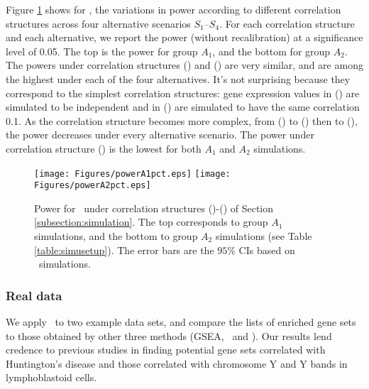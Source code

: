 	Figure \ref{fig:power} shows for \OurMethod, the variations in power according to different
	correlation structures across four alternative scenarios $S_1$--$S_4$. For each correlation 
	structure and each alternative, we report the power (without recalibration) at a significance 
	level of 0.05. The top is the power for group $A_1$, and the bottom for group $A_2$.  The 
	powers under correlation structures (\aaCase) and (\cCase) are very similar, and are among the 
	highest under each of the four alternatives. It's not surprising because they correspond to the 
	simplest correlation structures: gene expression values in (\aaCase) are simulated to be 
	independent and in (\cCase) are simulated to have the same correlation 0.1. As the correlation 
	structure becomes more complex, from (\aCase) to (\eCase) then
	to (\fCase), the power decreases under every alternative scenario. The power under correlation
	structure (\fCase) is the lowest for both $A_1$ and $A_2$ simulations.%
	
	\begin{figure}[!ht]
	\centering
			\texttt{[image: Figures/powerA1pct.eps]}
			\texttt{[image: Figures/powerA2pct.eps]}
		\caption[Power for \OurMethod~under correlation structures (\aaCase)-(\fCase)]{Power for 
		\OurMethod~under correlation structures (\aaCase)-(\fCase) of Section
			\ref{subsection:simulation}. The top corresponds to group $A_1$ simulations, and the 
			bottom to group
			$A_2$ simulations (see Table \ref{table:simusetup}). The error bars are the $95\%$ CIs 
			based on
			\HowmanySimu~simulations. }\label{fig:power}
	\end{figure} 
	

	\subsubsection{Real data}\label{section:realdata}
	We apply \OurMethod~to two example data sets, and compare the lists of enriched gene sets to 
	those obtained by other three methods (GSEA, \CMT~and \genr). %
	Our results lend credence to previous studies in finding potential gene sets correlated with
	Huntington's disease and those correlated with chromosome Y and Y bands in lymphoblastoid 
	cells.  
	
